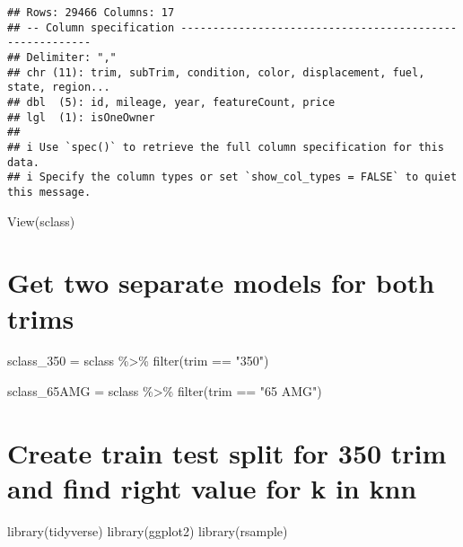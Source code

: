 \documentclass[
]{article}
\newenvironment{Shaded}{\begin{snugshade}}{\end{snugshade}}
\newcommand{\FunctionTok}[1]{\textcolor[rgb]{0.00,0.00,0.00}{#1}}
\newcommand{\NormalTok}[1]{#1}
\newcommand{\OtherTok}[1]{\textcolor[rgb]{0.56,0.35,0.01}{#1}}
\newcommand{\SpecialCharTok}[1]{\textcolor[rgb]{0.00,0.00,0.00}{#1}}
\newcommand{\StringTok}[1]{\textcolor[rgb]{0.31,0.60,0.02}{#1}}
\begin{document}
\begin{verbatim}
## Rows: 29466 Columns: 17
## -- Column specification --------------------------------------------------------
## Delimiter: ","
## chr (11): trim, subTrim, condition, color, displacement, fuel, state, region...
## dbl  (5): id, mileage, year, featureCount, price
## lgl  (1): isOneOwner
## 
## i Use `spec()` to retrieve the full column specification for this data.
## i Specify the column types or set `show_col_types = FALSE` to quiet this message.
\end{verbatim}

\begin{Shaded}
\begin{Highlighting}[]
\FunctionTok{View}\NormalTok{(sclass)}
\end{Highlighting}
\end{Shaded}

\hypertarget{get-two-separate-models-for-both-trims}{%
\section{Get two separate models for both
trims}\label{get-two-separate-models-for-both-trims}}

\begin{Shaded}
\begin{Highlighting}[]
\NormalTok{sclass\_350 }\OtherTok{=}\NormalTok{ sclass }\SpecialCharTok{\%\textgreater{}\%}
\FunctionTok{filter}\NormalTok{(trim }\SpecialCharTok{==} \StringTok{"350"}\NormalTok{)}

\NormalTok{sclass\_65AMG }\OtherTok{=}\NormalTok{ sclass }\SpecialCharTok{\%\textgreater{}\%}
\FunctionTok{filter}\NormalTok{(trim }\SpecialCharTok{==} \StringTok{"65 AMG"}\NormalTok{)}
\end{Highlighting}
\end{Shaded}

\hypertarget{create-train-test-split-for-350-trim-and-find-right-value-for-k-in-knn}{%
\section{Create train test split for 350 trim and find right value for k
in
knn}\label{create-train-test-split-for-350-trim-and-find-right-value-for-k-in-knn}}

\begin{Shaded}
\begin{Highlighting}[]
\FunctionTok{library}\NormalTok{(tidyverse)}
\FunctionTok{library}\NormalTok{(ggplot2)}
\FunctionTok{library}\NormalTok{(rsample)}
\end{Highlighting}
\end{Shaded}
\end{document}
